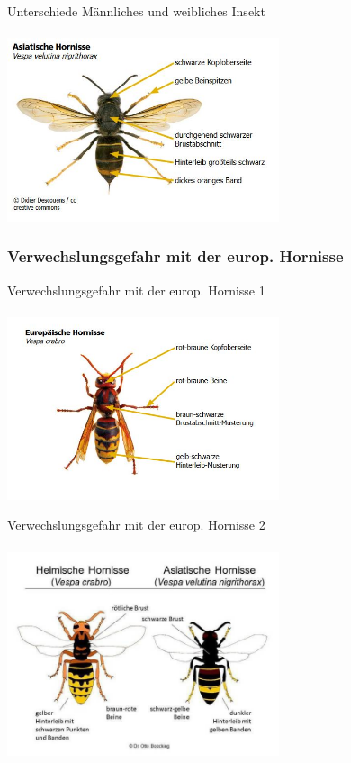 \documentclass[aspectratio=169]{beamer}
\begin{document}
\begin{frame}{Unterschiede Männliches und weibliches Insekt}
	\framesubtitle{} 

	\begin{center}	
		\includegraphics[width=0.6\textwidth]{figures/Asiatische_Hornisse.JPG}
	\end{center}

	\end{frame}

\subsubsection[Verwechslungsgefahr]{Verwechslungsgefahr mit der europ. Hornisse}

\begin{frame}{Verwechslungsgefahr mit der europ. Hornisse 1}
	\framesubtitle{} 
	\begin{center}	
		\includegraphics[width=0.6\textwidth]{figures/Europaeische_Hornisse.JPG}
	\end{center}
	\end{frame}

\begin{frame}{Verwechslungsgefahr mit der europ. Hornisse 2}
	\framesubtitle{} 
	\begin{center}	
		\includegraphics[width=0.6\textwidth]{figures/Boecking-Otto-cropped-195449.jpeg}
	\end{center}
	\end{frame}
\end{document}
